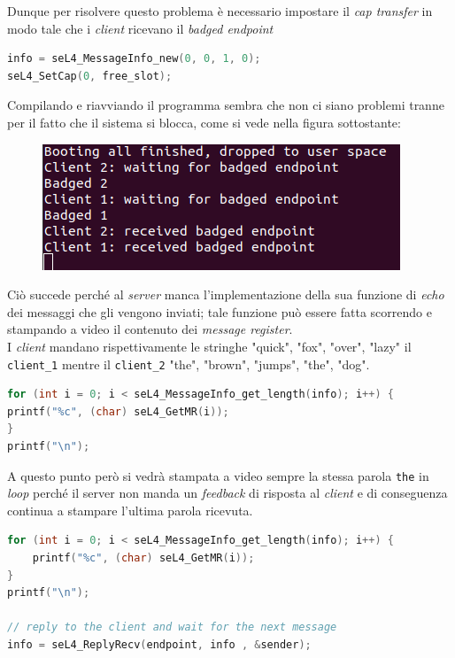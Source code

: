 Dunque per risolvere questo problema è necessario impostare il \textit{cap transfer} in modo tale che i \textit{client} ricevano il \textit{badged endpoint}
\begin{lstlisting}[language=C++]
info = seL4_MessageInfo_new(0, 0, 1, 0);
seL4_SetCap(0, free_slot);
\end{lstlisting}

Compilando e riavviando il programma sembra che non ci siano problemi tranne per il fatto che il sistema si blocca, come si vede nella figura sottostante:
\begin{figure}[H]
  \includegraphics[scale=0.7]{img/DopoBadgeIPC.png}%
  \centering
  \label{fig:AvvioDopoBadge}
\end{figure}

Ciò succede perché al \textit{server} manca l'implementazione della sua funzione di \textit{echo} dei messaggi che gli vengono inviati; tale funzione può essere fatta scorrendo e stampando a video il contenuto dei \textit{message register}.\\
I \textit{client} mandano rispettivamente le stringhe {"quick", "fox", "over", "lazy"} il \texttt{client\_1} mentre il \texttt{client\_2} {"the", "brown", "jumps", "the", "dog"}.
\begin{lstlisting}[language=C++]
for (int i = 0; i < seL4_MessageInfo_get_length(info); i++) {
printf("%c", (char) seL4_GetMR(i));
}
printf("\n");
\end{lstlisting}

A questo punto però si vedrà stampata a video sempre la stessa parola \texttt{the} in \textit{loop} perché il server non manda un \textit{feedback} di risposta al \textit{client} e di conseguenza continua a stampare l'ultima parola ricevuta.
\begin{lstlisting}[language=C++]
for (int i = 0; i < seL4_MessageInfo_get_length(info); i++) {
	printf("%c", (char) seL4_GetMR(i));
}
printf("\n");

// reply to the client and wait for the next message
info = seL4_ReplyRecv(endpoint, info , &sender);
\end{lstlisting}


